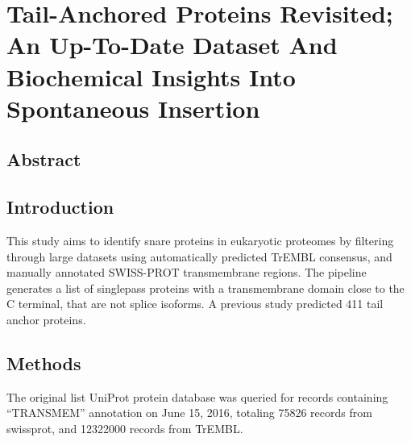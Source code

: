\chapter{Tail-Anchored Proteins Revisited; An Up-To-Date Dataset And Biochemical Insights Into Spontaneous Insertion} %
\section{Abstract}

\section{Introduction}
This study aims to identify \gls{snare} proteins in eukaryotic proteomes by filtering through large datasets using automatically predicted TrEMBL consensus, and manually annotated SWISS-PROT transmembrane regions. The pipeline generates a list of singlepass proteins with a transmembrane domain close to the C terminal, that are not splice isoforms. A previous study predicted 411 tail anchor proteins\cite{Kalbfleisch2007}.

\section{Methods}
The original list UniProt protein database was queried for records containing ``TRANSMEM'' annotation on June 15, 2016, totaling 75826 records from swissprot, and 12322000 records from TrEMBL.

